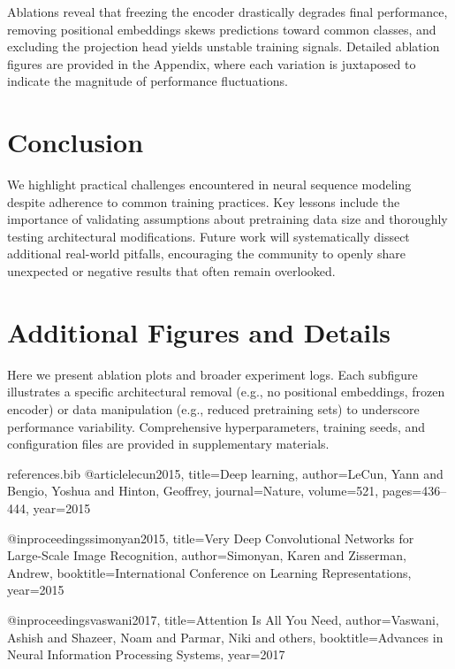 \documentclass[11pt]{article}
\begin{document}
Ablations reveal that freezing the encoder drastically degrades final performance, removing positional embeddings skews predictions toward common classes, and excluding the projection head yields unstable training signals. Detailed ablation figures are provided in the Appendix, where each variation is juxtaposed to indicate the magnitude of performance fluctuations.

\section{Conclusion}
We highlight practical challenges encountered in neural sequence modeling despite adherence to common training practices. Key lessons include the importance of validating assumptions about pretraining data size and thoroughly testing architectural modifications. Future work will systematically dissect additional real-world pitfalls, encouraging the community to openly share unexpected or negative results that often remain overlooked.

\appendix
\section{Additional Figures and Details}
Here we present ablation plots and broader experiment logs. Each subfigure illustrates a specific architectural removal (e.g., no positional embeddings, frozen encoder) or data manipulation (e.g., reduced pretraining sets) to underscore performance variability. Comprehensive hyperparameters, training seeds, and configuration files are provided in supplementary materials.

\clearpage
\begin{filecontents}{references.bib}
@article{lecun2015,
  title={Deep learning},
  author={LeCun, Yann and Bengio, Yoshua and Hinton, Geoffrey},
  journal={Nature},
  volume={521},
  pages={436--444},
  year={2015}
}

@inproceedings{simonyan2015,
  title={Very Deep Convolutional Networks for Large-Scale Image Recognition},
  author={Simonyan, Karen and Zisserman, Andrew},
  booktitle={International Conference on Learning Representations},
  year={2015}
}

@inproceedings{vaswani2017,
  title={Attention Is All You Need},
  author={Vaswani, Ashish and Shazeer, Noam and Parmar, Niki and others},
  booktitle={Advances in Neural Information Processing Systems},
  year={2017}
}
\end{filecontents}



\end{document}
